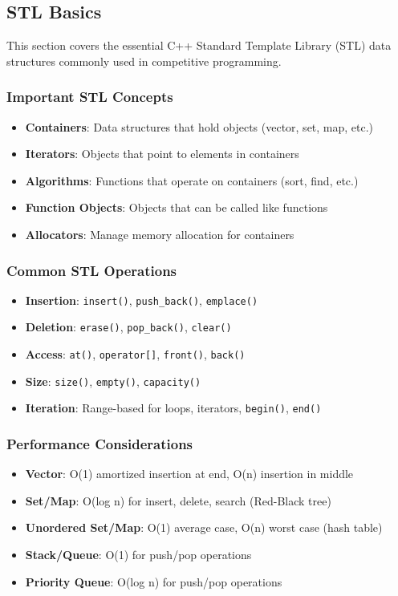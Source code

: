 \documentclass[11pt,a4paper]{article}
\begin{document}
\subsection{STL Basics}
This section covers the essential C++ Standard Template Library (STL) data structures commonly used in competitive programming.

\subsubsection{Important STL Concepts}

\begin{itemize}
\item \textbf{Containers}: Data structures that hold objects (vector, set, map, etc.)
\item \textbf{Iterators}: Objects that point to elements in containers
\item \textbf{Algorithms}: Functions that operate on containers (sort, find, etc.)
\item \textbf{Function Objects}: Objects that can be called like functions
\item \textbf{Allocators}: Manage memory allocation for containers
\end{itemize}

\subsubsection{Common STL Operations}
\begin{itemize}
\item \textbf{Insertion}: \texttt{insert()}, \texttt{push\_back()}, \texttt{emplace()}
\item \textbf{Deletion}: \texttt{erase()}, \texttt{pop\_back()}, \texttt{clear()}
\item \textbf{Access}: \texttt{at()}, \texttt{operator[]}, \texttt{front()}, \texttt{back()}
\item \textbf{Size}: \texttt{size()}, \texttt{empty()}, \texttt{capacity()}
\item \textbf{Iteration}: Range-based for loops, iterators, \texttt{begin()}, \texttt{end()}
\end{itemize}

\subsubsection{Performance Considerations}
\begin{itemize}
\item \textbf{Vector}: O(1) amortized insertion at end, O(n) insertion in middle
\item \textbf{Set/Map}: O(log n) for insert, delete, search (Red-Black tree)
\item \textbf{Unordered Set/Map}: O(1) average case, O(n) worst case (hash table)
\item \textbf{Stack/Queue}: O(1) for push/pop operations
\item \textbf{Priority Queue}: O(log n) for push/pop operations
\end{itemize}
\end{document}
